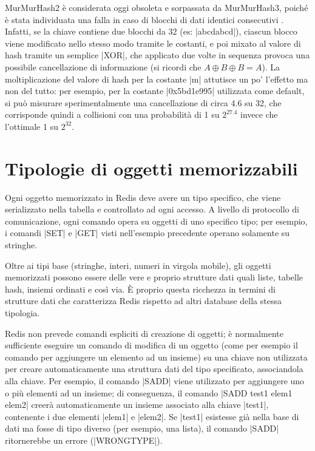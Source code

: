 MurMurHash2 è considerata oggi obsoleta e sorpassata da MurMurHash3, poiché è stata individuata una
falla in caso di blocchi di dati identici consecutivi \cite{murmur2flaw}. Infatti, se la chiave
contiene due blocchi da \SI{32}{\bit} (es: \cverb|abcdabcd|), ciascun blocco viene modificato nello
stesso modo tramite le costanti, e poi mixato al valore di hash tramite un semplice \cverb|XOR|, che
applicato due volte in sequenza provoca una possibile cancellazione di informazione (si ricordi che
$A \oplus B \oplus B = A$). La moltiplicazione del valore di hash per la costante \cverb|m| attutisce
un po' l'effetto ma non del tutto: per esempio, per la costante \cverb|0x5bd1e995| utilizzata come
default, si può misurare sperimentalmente una cancellazione di circa \SI{4.6}{\bit} su \num{32}, che
corrisponde quindi a collisioni con una probabilità di \num{1} su $2 ^ {27.4}$ invece che l'ottimale
\num{1} su $2 ^ {32}$.

\section{Tipologie di oggetti memorizzabili}

Ogni oggetto memorizzato in Redis deve avere un tipo specifico, che viene serializzato
nella tabella e controllato ad ogni accesso. A livello di protocollo di comunicazione,
ogni comando opera su oggetti di uno specifico tipo; per esempio, i comandi \cverb|SET|
e \cverb|GET| visti nell'esempio precedente operano solamente su stringhe.

Oltre ai tipi base (stringhe, interi, numeri in virgola mobile), gli oggetti memorizzati
possono essere delle vere e proprio strutture dati quali liste, tabelle hash, insiemi
ordinati e così via. È proprio questa ricchezza in termini di strutture dati che caratterizza
Redis rispetto ad altri database della stessa tipologia.

Redis non prevede comandi espliciti di creazione di oggetti; è normalmente sufficiente
eseguire un comando di modifica di un oggetto (come per esempio il comando per aggiungere
un elemento ad un insieme) su una chiave non utilizzata per creare automaticamente una
struttura dati del tipo specificato, associandola alla chiave. Per esempio, il comando
\cverb|SADD| viene utilizzato per aggiungere uno o più elementi ad un insieme; di
conseguenza, il comando \cverb|SADD test1 elem1 elem2| creerà automaticamente un insieme 
associato alla chiave \cverb|test1|, contenente i due elementi \cverb|elem1| e \cverb|elem2|.
Se \cverb|test1| esistesse già nella base di dati ma fosse di tipo diverso (per esempio,
una lista), il comando \cverb|SADD| ritornerebbe un errore (\cverb|WRONGTYPE|).

